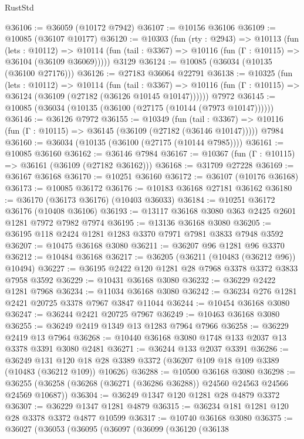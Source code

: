 \begin{lexlean}{RustStd}
\begin{coremodule}
@36106 := @36059 (@10172 @7942)
@36107 := @10156 @36106
@36109 := @10085 (@36107 @10177)
@36120 := @10303
    (fun (rty : @2943) =>
    @10113
      (fun (lets : @10112) =>
      @10114 (fun (tail : @3367) => @10116 (fun (Γ : @10115) => @36104 (@36109 @36069)))))
    @3129
@36124 := @10085 (@36034 (@10135 (@36100 @27176)))
@36126 := @27183 @36064 @22791
@36138 := @10325
    (fun (lets : @10112) =>
    @10114
      (fun (tail : @3367) =>
      @10116 (fun (Γ : @10115) => @36124 (@36109 (@27182 (@36126 @10145 @10147))))))
    @7972
@36145 := @10085 (@36034 (@10135 (@36100 (@27175 (@10144 (@7973 @10147))))))
@36146 := @36126 @7972
@36155 := @10349
    (fun (tail : @3367) => @10116 (fun (Γ : @10115) => @36145 (@36109 (@27182 (@36146 @10147)))))
    @7984
@36160 := @36034 (@10135 (@36100 (@27175 (@10144 @7985))))
@36161 := @10085 @36160
@36162 := @36146 @7984
@36167 := @10367 (fun (Γ : @10115) => @36161 (@36109 (@27182 @36162)))
@36168 := @31709 @27228
@36169 := @36167 @36168
@36170 := @10251 @36160
@36172 := @36107 (@10176 @36168)
@36173 := @10085 @36172
@36176 := @10183 @36168 @27181 @36162
@36180 := @36170 (@36173 @36176) (@10403 @36033)
@36184 := @10251 @36172 @36176 (@10408 @36106)
@36193 := @13117 @36168 @3080 @363 @2425 @2601 @1281 @7972 @7982 @7974
@36195 := @13136 @36168 @3080
@36205 := @36195 @118 @2424 @1281 @1283 @3370 @7971 @7981 @3833 @7948 @3592
@36207 := @10475 @36168 @3080
@36211 := @36207 @96 @1281 @96 @3370
@36212 := @10484 @36168
@36217 := @36205 (@36211 (@10483 (@36212 @96)) @10494)
@36227 := @36195 @2422 @120 @1281 @28 @7968 @3378 @3372 @3833 @7958 @3592
@36229 := @10431 @36168 @3080
@36232 := @36229 @2422 @1281 @7968
@36234 := @11034 @36168 @3080
@36242 := @36234 @276 @1281 @2421 @20725 @3378 @7967 @3847 @11044
@36244 := @10454 @36168 @3080
@36247 := @36244 @2421 @20725 @7967
@36249 := @10463 @36168 @3080
@36255 := @36249 @2419 @1349 @13 @1283 @7964 @7966
@36258 := @36229 @2419 @13 @7964
@36268 := @10440 @36168 @3080 @1748 @133 @2037 @13 @3378 @3391 @3080 @2481
@36271 := @36244 @133 @2037 @3391
@36286 := @36249
    @131
    @120
    @18
    @28
    @3389
    @3372
    (@36207 @109 @18 @109 @3389 (@10483 (@36212 @109)) @10626)
@36288 := @10500 @36168 @3080
@36298 := @36255 (@36258 (@36268 (@36271 (@36286 @36288)) @24560 @24563 @24566 @24569 @10687))
@36304 := @36249 @1347 @120 @1281 @28 @4879 @3372
@36307 := @36229 @1347 @1281 @4879
@36315 := @36234 @181 @1281 @120 @28 @3378 @3372 @4877 @10599
@36317 := @10740 @36168 @3080
@36375 := @36027
    (@36053
      (@36095
        (@36097
          (@36099
            (@36120
              (@36138

\end{coremodule}
\end{lexlean}
